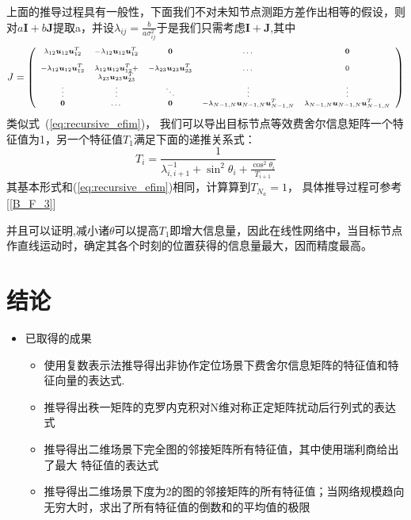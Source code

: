 上面的推导过程具有一般性，下面我们不对未知节点测距方差作出相等的假设，则对$a\bm{I}+b\bm{J}$提取a，并设$\lambda_{ij}=\frac{b}{a\sigma_{ij}^2}$于是我们只需考虑$\bm{I}+\bm{J}$,其中
\[\scriptsize{
J=\left(
\begin{array}{ccccc}
\lambda_{12}\bm{u}_{12}\bm{u}_{12}^T&-\lambda_{12}\bm{u}_{12}\bm{u}_{12}^T&\bm{0}&\dots&\bm{0}\\
&&&&\\
-\lambda_{12}\bm{u}_{12}\bm{u}_{12}^T&\lambda_{12}\bm{u}_{12}\bm{u}_{12}^T+&-\lambda_{23}\bm{u}_{23}\bm{u}_{23}^T&\dots&0\\
&\lambda_{23}\bm{u}_{23}\bm{u}_{23}^T&&&\\
\vdots &\vdots&\ddots &\vdots&\vdots\\
\bm{0}&\dots&\bm{0}&-\lambda_{N-1,N}\bm{u}_{N-1,N}\bm{u}_{N-1,N}^T&\lambda_{N-1,N}\bm{u}_{N-1,N}\bm{u}_{N-1,N}^T\\
\end{array}
\right)}
\]
类似式~(\ref{eq:recursive_efim})，
我们可以导出目标节点等效费舍尔信息矩阵一个特征值为1，另一个特征值$T_1$满足下面的递推关系式：
\begin{equation}\label{eq:recursive_efim_second}
  T_i=\frac{1}{\lambda_{i,i+1}^{-1}+\sin^2\theta_i+\frac{\cos^2\theta_i}{T_{i+1}}}
\end{equation}
其基本形式和(\ref{eq:recursive_efim})相同，计算算到$T_{N_a}=1$，
具体推导过程可参考[\ref{B_F_3}]

并且可以证明,减小诸$\theta$可以提高$T_1$即增大信息量，因此在线性网络中，当目标节点作直线运动时，确定其各个时刻的位置获得的信息量最大，因而精度最高。
\section{结论}

  \begin{itemize}
  \item
    已取得的成果
  \begin{itemize}
  \item
    使用复数表示法推导得出非协作定位场景下费舍尔信息矩阵的特征值和特征向量的表达式.
  \item
    推导得出秩一矩阵的克罗内克积对N维对称正定矩阵扰动后行列式的表达式
  \item
    推导得出二维场景下完全图的邻接矩阵所有特征值，其中使用瑞利商给出了最大 特征值的表达式
    \item 推导得出二维场景下度为2的图的邻接矩阵的所有特征值；当网络规模趋向无穷大时，求出了所有特征值的倒数和的平均值的极限
  \end{itemize}
  \end{itemize}
